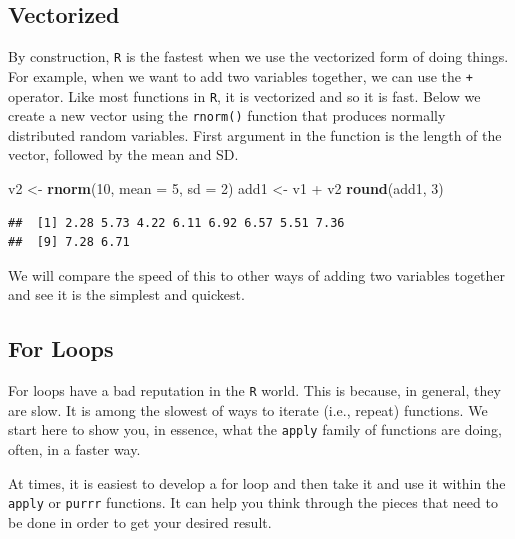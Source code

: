 \documentclass[]{tufte-book}
\newenvironment{Shaded}{}{}
\newcommand{\KeywordTok}[1]{\textcolor[rgb]{0.00,0.44,0.13}{\textbf{#1}}}
\newcommand{\DataTypeTok}[1]{\textcolor[rgb]{0.56,0.13,0.00}{#1}}
\newcommand{\DecValTok}[1]{\textcolor[rgb]{0.25,0.63,0.44}{#1}}
\newcommand{\StringTok}[1]{\textcolor[rgb]{0.25,0.44,0.63}{#1}}
\newcommand{\OperatorTok}[1]{\textcolor[rgb]{0.40,0.40,0.40}{#1}}
\newcommand{\NormalTok}[1]{#1}
\theoremstyle{definition}
\theoremstyle{definition}
\theoremstyle{remark}
\begin{document}
\subsection*{Vectorized}\label{vectorized}

By construction, \texttt{R} is the fastest when we use the vectorized
form of doing things. For example, when we want to add two variables
together, we can use the \texttt{+} operator. Like most functions in
\texttt{R}, it is vectorized and so it is fast. Below we create a new
vector using the \texttt{rnorm()} function that produces normally
distributed random variables. First argument in the function is the
length of the vector, followed by the mean and SD.

\begin{Shaded}
\begin{Highlighting}[]
\NormalTok{v2 <-}\StringTok{ }\KeywordTok{rnorm}\NormalTok{(}\DecValTok{10}\NormalTok{, }\DataTypeTok{mean =} \DecValTok{5}\NormalTok{, }\DataTypeTok{sd =} \DecValTok{2}\NormalTok{)}
\NormalTok{add1 <-}\StringTok{ }\NormalTok{v1 }\OperatorTok{+}\StringTok{ }\NormalTok{v2}
\KeywordTok{round}\NormalTok{(add1, }\DecValTok{3}\NormalTok{)}
\end{Highlighting}
\end{Shaded}

\begin{verbatim}
##  [1] 2.28 5.73 4.22 6.11 6.92 6.57 5.51 7.36
##  [9] 7.28 6.71
\end{verbatim}

We will compare the speed of this to other ways of adding two variables
together and see it is the simplest and quickest.

\subsection*{For Loops}\label{for-loops}

For loops have a bad reputation in the \texttt{R} world. This is
because, in general, they are slow. It is among the slowest of ways to
iterate (i.e., repeat) functions. We start here to show you, in essence,
what the \texttt{apply} family of functions are doing, often, in a
faster way.

At times, it is easiest to develop a for loop and then take it and use
it within the \texttt{apply} or \texttt{purrr} functions. It can help
you think through the pieces that need to be done in order to get your
desired result.
\end{document}
